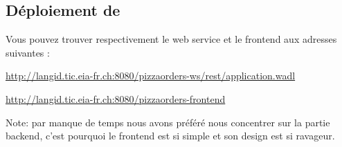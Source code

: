 \subsection{Déploiement de }

Vous pouvez trouver respectivement le web service et le frontend aux adresses suivantes :

\url{http://langid.tic.eia-fr.ch:8080/pizzaorders-ws/rest/application.wadl}

\url{http://langid.tic.eia-fr.ch:8080/pizzaorders-frontend}

Note: par manque de temps nous avons préféré nous concentrer sur la partie backend, c'est pourquoi 
le frontend est si simple et son design est si ravageur.


